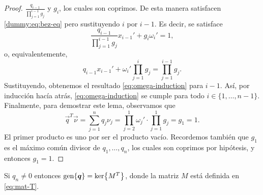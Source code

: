 \begin{proof}
	$\frac{q_{i-1}}{\prod_{j=1}^{i-1}g_j}$ y $g_i$, los cuales son coprimos. De esta manera
	satisfacen \eqref{dummy:eq:bez-eq} pero sustituyendo $i$ por $i - 1$. Es decir, se satisface
	\begin{equation*}
		\frac{q_{i-1}}{\prod_{j=1}^{i-1}g_j}x_{i-1}' +
		g_i \omega_i' = 1,
	\end{equation*}
	o, equivalentemente,
	\begin{equation*}
		q_{i-1}x_{i-1}' + \omega_i'\prod_{j=1}^{i}g_j = \prod_{j=1}^{i-1}g_j.
	\end{equation*}
	Sustituyendo, obtenemos el resultado \eqref{eq:omega-induction} para $i - 1$. Así, por inducción
	hacía atrás, \eqref{eq:omega-induction} se cumple para todo $i \in \lbrace 1, \ldots, n - 1
	\rbrace$. Finalmente, para demostrar este lema, observamos que
	\begin{equation*}
		\vec{q}^T\vec{\nu} = \sum_{j=1}^{n}q_j\nu_j = \prod_{j=2}^{1}\omega_j'
		\cdot \prod_{j=1}^{1}g_j = g_1 = 1.
	\end{equation*}
	El primer producto es uno por ser el producto vacío. Recordemos también que $g_1$ es el máximo
	común divisor de $q_1, \ldots, q_n$, los cuales son coprimos por hipótesis, y entonces $g_1 = 1$.
\end{proof}
\begin{lemma}
	\label{lemma:iso2}
	Si $q_n \neq 0$ entonces $\operatorname{gen}\lbrace \boldsymbol{q} \rbrace = \mathop{\mathrm{ker}{\left\lbrace M^T \right\rbrace}}$, donde la matriz $M$ está
	definida en \eqref{eq:mat-T}.
\end{lemma}
